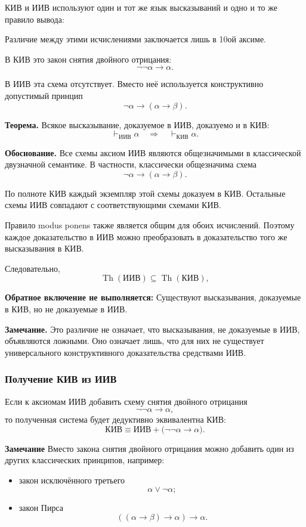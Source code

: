 \documentclass[12pt,a4paper,oneside,openany]{book}
\theoremstyle{definition}
\theoremstyle{plain}
\theoremstyle{remark}
\begin{document}
КИВ и ИИВ используют один и тот же язык высказываний и одно и то же
правило вывода:

Различие между этими исчислениями заключается лишь в 10ой аксиме.

В КИВ это закон снятия двойного отрицания:
\[
\neg\neg\alpha\to\alpha.
\]

В ИИВ эта схема отсутствует. Вместо неё используется конструктивно
допустимый принцип
\[
\neg\alpha\to(\alpha\to\beta).
\]

\textbf{Теорема.}
Всякое высказывание, доказуемое в ИИВ, доказуемо и в КИВ:
\[
\vdash_{\mathrm{ИИВ}}\alpha
\quad\Longrightarrow\quad
\vdash_{\mathrm{КИВ}}\alpha.
\]


\textbf{Обоснование.}
Все схемы аксиом ИИВ являются общезначимыми в классической
двузначной семантике. В частности, классически общезначима схема
\[
\neg\alpha\to(\alpha\to\beta).
\]

По полноте КИВ каждый экземпляр этой схемы доказуем в КИВ. Остальные
схемы ИИВ совпадают с соответствующими схемами КИВ.

Правило modus ponens также является общим для обоих исчислений.
Поэтому каждое доказательство в ИИВ можно преобразовать в
доказательство того же высказывания в КИВ.

Следовательно,
\[
\operatorname{Th}(\mathrm{ИИВ})
\subseteq
\operatorname{Th}(\mathrm{КИВ}),
\]

\textbf{Обратное включение не выполняется:}
Существуют высказывания, доказуемые в КИВ, но не доказуемые в ИИВ.

\textbf{Замечание.}
Это различие не означает, что высказывания, не доказуемые в ИИВ,
объявляются ложными. Оно означает лишь, что для них не существует
универсального конструктивного доказательства средствами ИИВ.

\subsubsection{Получение КИВ из ИИВ}

Если к аксиомам ИИВ добавить схему снятия двойного отрицания
\[
\neg\neg\alpha\to\alpha,
\]
то полученная система будет дедуктивно эквивалентна КИВ:
\[
\mathrm{КИВ}
\equiv
\mathrm{ИИВ}
+
\bigl(\neg\neg\alpha\to\alpha\bigr).
\]


\textbf{Замечание} Вместо закона снятия двойного отрицания можно добавить один из других
классических принципов, например:

\begin{itemize}
    \item закон исключённого третьего
          \[
          \alpha\lor\neg\alpha;
          \]

    \item закон Пирса
          \[
          ((\alpha\to\beta)\to\alpha)\to\alpha.
          \]
\end{itemize}
\end{document}
